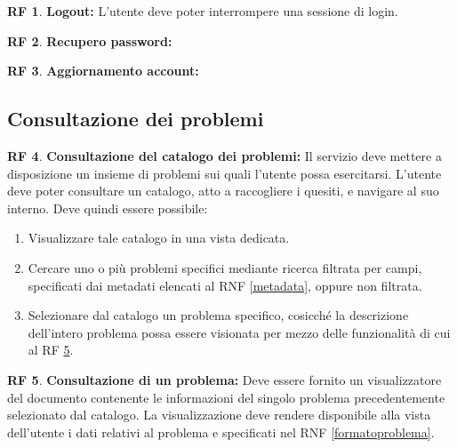 \documentclass[11pt, a4paper]{article}
\theoremstyle{definition}
\newtheorem{funcreq}{RF} %
\begin{document}
\begin{funcreq}
\textbf{Logout:}
L'utente deve poter interrompere una sessione di login.
\end{funcreq}

\begin{funcreq}
\textbf{Recupero password:}
\end{funcreq}

\begin{funcreq}
\textbf{Aggiornamento account:}
\end{funcreq}

\subsection{Consultazione dei problemi}

\begin{funcreq}
\textbf{Consultazione del catalogo dei problemi:}
Il servizio deve mettere a disposizione un insieme di problemi sui quali
l'utente possa esercitarsi. L'utente deve poter consultare un catalogo,
atto a raccogliere i quesiti, e navigare al suo interno. Deve quindi
essere possibile:
\begin{enumerate}
    \item Visualizzare tale catalogo in una vista dedicata.
    
    \item Cercare uno o più problemi specifici mediante ricerca filtrata
    per campi, specificati dai metadati elencati al RNF \ref{metadata},
    oppure non filtrata.

    \item Selezionare dal catalogo un problema specifico, cosicché la
    descrizione dell'intero problema possa essere visionata per mezzo
    delle funzionalità di cui al RF \ref{seeproblem}.
\end{enumerate}
\end{funcreq}

\begin{funcreq}
\label{seeproblem}
\textbf{Consultazione di un problema:}
Deve essere fornito un visualizzatore del documento contenente le
informazioni del singolo problema precedentemente selezionato dal
catalogo. La visualizzazione deve rendere disponibile alla vista
dell'utente i dati relativi al problema e specificati nel RNF
\ref{formatoproblema}.
\end{funcreq}
\end{document}
